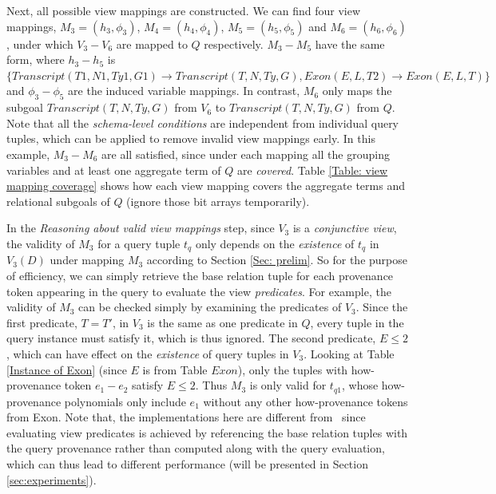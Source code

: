 \begin{example}
Next, all possible view mappings are constructed. We can find four view mappings, $M_3=(h_3,\phi_3)$, $M_4=(h_4, \phi_4)$, $M_5=(h_5, \phi_5)$ and $M_6=(h_6, \phi_6)$, under which $V_3-V_6$ are mapped to $Q$ respectively. $M_3-M_5$ have the same form, where $h_3-h_5$ is $\{Transcript(T1, N1, Ty1, G1) \rightarrow Transcript(T, N, Ty, G), Exon(E, L, T2)\rightarrow Exon(E, L, T)\}$ and $\phi_3-\phi_5$ are the induced variable mappings. In contrast, $M_6$ only maps the subgoal $Transcript(T, N, Ty, G)$ from $V_6$ to $Transcript(T, N, Ty, G)$ from $Q$. Note that all the {\em schema-level conditions} are independent from individual query tuples, which can be applied to remove invalid view mappings early. In this example, $M_3-M_6$ are all satisfied, since under each mapping all the grouping variables and at least one aggregate term of $Q$ are {\em covered}. Table \ref{Table: view mapping coverage} shows how each view mapping covers the aggregate terms and relational subgoals of $Q$ (ignore those bit arrays temporarily).

In the {\em Reasoning about valid view mappings} step, since $V_3$ is a \textit{conjunctive view}, the validity of $M_3$ for a query tuple $t_q$ only depends on the {\em existence} of $t_q$ in $V_3(D)$ under mapping $M_3$ according to Section \ref{Sec: prelim}. So for the purpose of efficiency, we can simply retrieve the base relation tuple for each provenance token appearing in the query to evaluate the view \textit{predicates}. For example, the validity of $M_3$ can be checked simply by examining the predicates of $V_3$. Since the first predicate, $T = T'$, in $V_3$ is the same as one predicate in $Q$, every tuple in the query instance must satisfy it, which is thus ignored. The second predicate, $E \leq 2$, which can have effect on the {\em existence} of query tuples in $V_3$. Looking at Table \ref{Instance of Exon} (since $E$ is from Table $Exon$), only the tuples with how-provenance token $e_1-e_2$ satisfy $E \leq 2$. Thus $M_3$ is only valid for $t_{{q}1}$, whose how-provenance polynomials only include $e_1$ without any other how-provenance tokens from Exon. Note that, the implementations here are different from \rba\ since evaluating view predicates is achieved by referencing the base relation tuples with the query provenance rather than computed along with the query evaluation, which can thus lead to different performance (will be presented in Section \ref{sec:experiments}).


\end{example}
